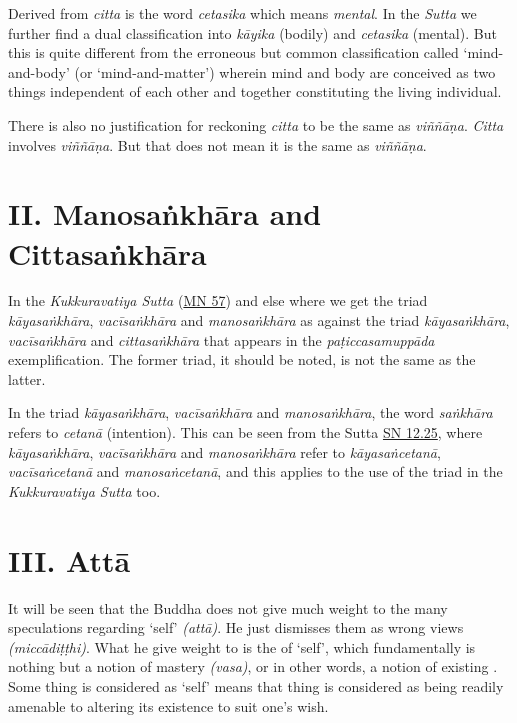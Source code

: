 Derived from \emph{citta} is the word \emph{cetasika} which means \emph{mental}. In the \emph{Sutta} we further find a dual classification into \emph{kāyika} (bodily) and \emph{cetasika} (mental). But this is quite different from the erroneous but common classification called `mind-and-body' (or `mind-and-matter') wherein mind and body are conceived as two things independent of each other and together constituting the living individual.

There is also no justification for reckoning \emph{citta} to be the same as \emph{viññāṇa}. \emph{Citta} involves \emph{viññāṇa}. But that does not mean it is the same as \emph{viññāṇa}.

\hypertarget{_ii_manosaux1e45khux101ra_and_cittasaux1e45khux101ra}{%
\section{II. Manosaṅkhāra and Cittasaṅkhāra}\label{_ii_manosaux1e45khux101ra_and_cittasaux1e45khux101ra}}

In the \emph{Kukkuravatiya Sutta} (\href{https://suttacentral.net/mn57/en/bodhi}{MN 57}) and else where we get the triad \emph{kāyasaṅkhāra}, \emph{vacīsaṅkhāra} and \emph{manosaṅkhāra} as against the triad \emph{kāyasaṅkhāra}, \emph{vacīsaṅkhāra} and \emph{cittasaṅkhāra} that appears in the \emph{paṭiccasamuppāda} exemplification. The former triad, it should be noted, is not the same as the latter.

In the triad \emph{kāyasaṅkhāra}, \emph{vacīsaṅkhāra} and \emph{manosaṅkhāra}, the word \emph{saṅkhāra} refers to \emph{cetanā} (intention). This can be seen from the Sutta \href{https://suttacentral.net/sn12.25/en/bodhi}{SN 12.25}, where \emph{kāyasaṅkhāra}, \emph{vacīsaṅkhāra} and \emph{manosaṅkhāra} refer to \emph{kāyasaṅcetanā}, \emph{vacīsaṅcetanā} and \emph{manosaṅcetanā}, and this applies to the use of the triad in the \emph{Kukkuravatiya Sutta} too.

\hypertarget{_iii_attux101}{%
\section{III. Attā}\label{_iii_attux101}}

It will be seen that the Buddha does not give much weight to the many speculations regarding `self' \emph{(attā)}. He just dismisses them as wrong views \emph{(miccādiṭṭhi)}. What he  give weight to is the  of `self', which fundamentally is nothing but a notion of mastery \emph{(vasa)}, or in other words, a notion of existing . Some thing is considered as `self' means that thing is considered as being readily amenable to altering its existence to suit one's wish.


